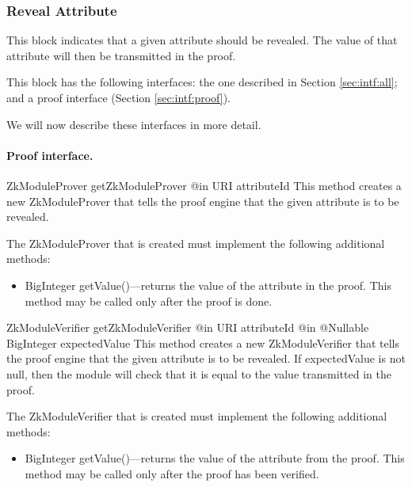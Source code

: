     \subsubsection{Reveal Attribute}

    This block indicates that a given attribute should be revealed.
    The value of that attribute will then be transmitted in the proof.

    This block has the following interfaces:
    the one described in Section \ref{sec:intf:all};
    and a proof interface (Section \ref{sec:intf:proof}).

    We will now describe these interfaces in more detail.

    \paragraph{Proof interface.}
      \begin{method}
      {ZkModuleProver}
      {getZkModuleProver}
      {
        {@in URI attributeId}
      }
      This method creates a new ZkModuleProver that tells the proof engine that
      the given attribute is to be revealed.

      The ZkModuleProver that is created must implement the following additional methods:
      \begin{itemize}
        \item BigInteger getValue()---returns the value of the attribute in the proof.
                This method may be called only after the proof is done.
      \end{itemize}
      \end{method}
      \begin{method}
      {ZkModuleVerifier}
      {getZkModuleVerifier}
      {
        {@in URI attributeId}
        {@in @Nullable BigInteger expectedValue}
      }
      This method creates a new ZkModuleVerifier that tells the proof engine that
      the given attribute is to be revealed.
      If expectedValue is not null, then the module will check that it is equal
      to the value transmitted in the proof.

      The ZkModuleVerifier that is created must implement the following additional methods:
      \begin{itemize}
        \item BigInteger getValue()---returns the value of the attribute from the proof.
                This method may be called only after the proof has been verified.
      \end{itemize}
      \end{method}

